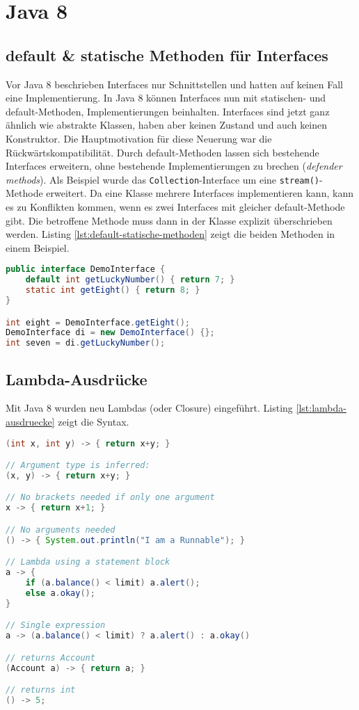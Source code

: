 \chapter{Java 8}

\section{default \& statische Methoden für Interfaces}

Vor Java 8 beschrieben Interfaces nur Schnittstellen und hatten auf keinen Fall eine Implementierung. In Java 8 können Interfaces nun mit statischen- und default-Methoden, Implementierungen beinhalten. Interfaces sind jetzt ganz ähnlich wie abstrakte Klassen, haben aber keinen Zustand und auch keinen Konstruktor. Die Hauptmotivation für diese Neuerung war die Rückwärtskompatibilität. Durch default-Methoden lassen sich bestehende Interfaces erweitern, ohne bestehende Implementierungen zu brechen (\textit{defender methods}). Als Beispiel wurde das \verb|Collection|-Interface um eine \verb|stream()|-Methode erweitert. Da eine Klasse mehrere Interfaces implementieren kann, kann es zu Konflikten kommen, wenn es zwei Interfaces mit gleicher default-Methode gibt. Die betroffene Methode muss dann in der Klasse explizit überschrieben werden. Listing \ref{lst:default-statische-methoden} zeigt die beiden Methoden in einem Beispiel.

\begin{lstlisting}[language=Java, caption=Default- und statische Methoden, label=lst:default-statische-methoden]
public interface DemoInterface {
	default int getLuckyNumber() { return 7; }
	static int getEight() { return 8; }
}

int eight = DemoInterface.getEight();
DemoInterface di = new DemoInterface() {};
int seven = di.getLuckyNumber();
\end{lstlisting}

\section{Lambda-Ausdrücke}

Mit Java 8 wurden neu Lambdas (oder Closure) eingeführt. Listing \ref{lst:lambda-ausdruecke} zeigt die Syntax.

\begin{lstlisting}[language=Java, caption=Lambda-Ausdrücke, label=lst:lambda-ausdruecke]
(int x, int y) -> { return x+y; }

// Argument type is inferred:
(x, y) -> { return x+y; }

// No brackets needed if only one argument
x -> { return x+1; }

// No arguments needed
() -> { System.out.println("I am a Runnable"); }

// Lambda using a statement block
a -> {
	if (a.balance() < limit) a.alert();
	else a.okay();
}

// Single expression
a -> (a.balance() < limit) ? a.alert() : a.okay()

// returns Account
(Account a) -> { return a; }

// returns int
() -> 5;
\end{lstlisting}

